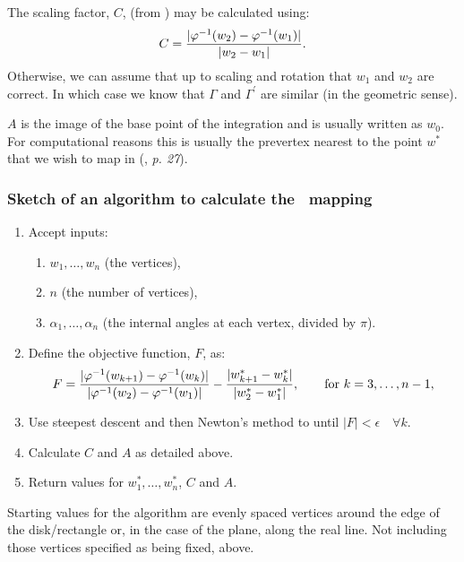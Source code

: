 The scaling factor, $C$, (from ) may be calculated using:
\begin{equation}
C=\frac{\vert \varphi^{-1}(w_2)-\varphi^{-1}(w_1)\vert}{\vert w_2 - w_1\vert}.
\end{equation}
Otherwise, we can assume that up to scaling and rotation that $w_1$ and $w_2$ are correct. In which case we know that $\Gamma$ and $\Gamma^\prime$ are similar (in the geometric sense). 

$A$ is the image of the base point of the integration and is usually written as $w_0$. For computational reasons this is usually the prevertex nearest to the point $w^*$ that we wish to map in   (\cite{driscoll}, \emph{p. 27}).


\subsubsection{Sketch of an algorithm to calculate the \sch\ mapping}
\label{algorithmsketch}
\begin{enumerate}
\item Accept inputs:
   \begin{enumerate} 
      \item $w_1,\dots,w_n$ (the vertices),
      \item $n$ (the number of vertices),
      \item $\alpha_1,\dots,\alpha_n$ (the internal angles at each vertex, divided by $\pi$).
   \end{enumerate}
\item Define the objective function, $F$, as:
 \begin{equation*}
F=\frac{\vert \varphi^{-1}(w_{k+1}) -  \varphi^{-1}(w_k) \vert}{\vert \varphi^{-1}(w_2)-\varphi^{-1}(w_1)\vert} - \frac{\vert w^*_{k+1} - w^*_k\vert}{\vert w^*_2 - w^*_1\vert}, \qquad \text{for } k=3,\dots,n-1,
 \end{equation*}
\item Use steepest descent and then Newton's method to until $\vert F\vert < \epsilon \quad \forall k$. \item Calculate $C$ and $A$ as detailed above.
\item Return values for $w^*_1,\dots,w^*_n$, $C$ and $A$.
\end{enumerate}

Starting values for the algorithm are evenly spaced vertices around the edge of the disk/rectangle or, in the case of the plane, along the real line. Not including those vertices specified as being fixed, above.

